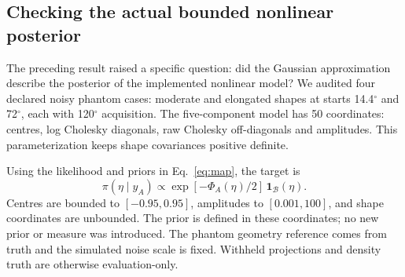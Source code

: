 \documentclass[11pt,a4paper]{article}
\newcommand{\degree}{\ensuremath{^{\circ}}}
\begin{document}
\newpage
\subsection{Checking the actual bounded nonlinear posterior}
The preceding result raised a specific question: did the Gaussian approximation describe the posterior of the implemented nonlinear model? We audited four declared noisy phantom cases: moderate and elongated shapes at starts 14.4\degree{} and 72\degree{}, each with 120\degree{} acquisition. The five-component model has 50 coordinates: centres, log Cholesky diagonals, raw Cholesky off-diagonals and amplitudes. This parameterization keeps shape covariances positive definite.

Using the likelihood and priors in Eq.~\eqref{eq:map}, the target is \cite{laplace}
\begin{equation}
\pi(\eta\mid y_A)\propto\exp[-\Phi_A(\eta)/2]\,\mathbf1_{\mathcal B}(\eta).\label{eq:target}
\end{equation}
Centres are bounded to $[-0.95,0.95]$, amplitudes to $[0.001,100]$, and shape coordinates are unbounded. The prior is defined in these coordinates; no new prior or measure was introduced. The phantom geometry reference comes from truth and the simulated noise scale is fixed. Withheld projections and density truth are otherwise evaluation-only.
\end{document}
